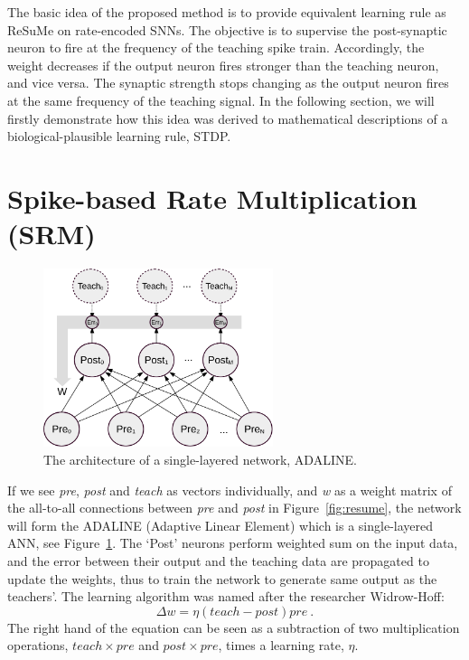 The basic idea of the proposed method is to provide equivalent learning rule as ReSuMe on rate-encoded SNNs.
The objective is to supervise the post-synaptic neuron to fire at the frequency of the teaching spike train. 
Accordingly, the weight decreases if the output neuron fires stronger than the teaching neuron, and vice versa.
The synaptic strength stops changing as the output neuron fires at the same frequency of the teaching signal.
In the following section, we will firstly demonstrate how this idea was derived to mathematical descriptions of a biological-plausible learning rule, STDP.
 

\section{Spike-based Rate Multiplication (SRM)}
\label{sec:SRM}
\begin{figure}
	\centering
	\includegraphics[width=0.6\textwidth]{pics_sdlm/adaline.pdf}
	\caption{The architecture of a single-layered network, ADALINE.}
	\label{fig:adaline}
\end{figure}
If we see \textit{pre}, \textit{post} and \textit{teach} as vectors individually, and \textit{w} as a weight matrix of the all-to-all connections between \textit{pre} and \textit{post} in Figure~\ref{fig:resume}, the network will form the ADALINE (Adaptive Linear Element) which is a single-layered ANN, see Figure~\ref{fig:adaline}.
The `Post' neurons perform weighted sum on the input data, and the error between their output and the teaching data are propagated to update the weights, thus to train the network to generate same output as the teachers'. 
The learning algorithm was named after the researcher Widrow-Hoff:
\begin{equation}
\Delta w = \eta (teach - post)pre~.
\label{equ:widrow-hoff}
\end{equation}
The right hand of the equation can be seen as a subtraction of two multiplication operations, $teach \times pre$ and $post \times pre$, times a learning rate, $\eta$.

